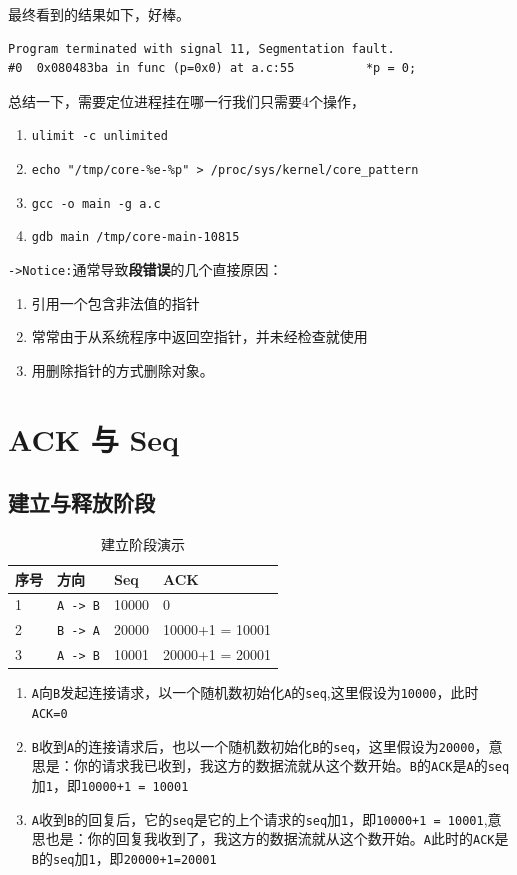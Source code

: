 \documentclass[UTF8,a4paper,12pt]{ctexbook}
\begin{document}
		 最终看到的结果如下，好棒。
		 \begin{lstlisting}
Program terminated with signal 11, Segmentation fault.
#0  0x080483ba in func (p=0x0) at a.c:55          *p = 0;
		 \end{lstlisting}
		 
		 总结一下，需要定位进程挂在哪一行我们只需要4个操作，
		 \begin{enumerate}[itemindent = 2em]
		 	\item \verb|ulimit -c unlimited|
		 	\item \verb|echo "/tmp/core-%e-%p" > /proc/sys/kernel/core_pattern|
		 	\item \verb|gcc -o main -g a.c|
		 	\item \verb|gdb main /tmp/core-main-10815| 
		 \end{enumerate}
		 
		\verb|->Notice:|通常导致\textbf{段错误}的几个直接原因：
		\begin{enumerate}[itemindent = 2em]
			\item 引用一个包含非法值的指针
			\item 常常由于从系统程序中返回空指针，并未经检查就使用
			\item 用删除指针的方式删除对象。
		\end{enumerate}
		
		
	\section{ACK 与 Seq}
		\subsection{建立与释放阶段}
			\begin{table}[htbp]
				\centering
				\caption{建立阶段演示}
				\begin{tabular}{m{1cm}|m{3cm}|m{4cm}|m{4cm}}
					\toprule
						序号 & 方向 & Seq & ACK \\
					\midrule
						 1& \verb|A -> B|& 10000 & 0 \\
						 2& \verb|B -> A|& 20000 & 10000+1 = 10001 \\
					 	 3& \verb|A -> B|& 10001 & 20000+1 = 20001 \\
					\bottomrule
				\end{tabular}
			\end{table}
			\begin{enumerate}
				\item \verb|A|向\verb|B|发起连接请求，以一个随机数初始化\verb|A|的\verb|seq|,这里假设为\verb|10000|，此时\verb|ACK=0|
				\item \verb|B|收到\verb|A|的连接请求后，也以一个随机数初始化\verb|B|的\verb|seq|，这里假设为\verb|20000|，意思是：你的请求我已收到，我这方的数据流就从这个数开始。\verb|B|的\verb|ACK|是\verb|A|的\verb|seq|加\verb|1|，即\verb|10000+1 = 10001|
				\item \verb|A|收到\verb|B|的回复后，它的\verb|seq|是它的上个请求的\verb|seq|加\verb|1|，即\verb|10000+1 = 10001|,意思也是：你的回复我收到了，我这方的数据流就从这个数开始。\verb|A|此时的\verb|ACK|是\verb|B|的\verb|seq|加\verb|1|，即\verb|20000+1=20001|
			\end{enumerate}
		
\end{document}
